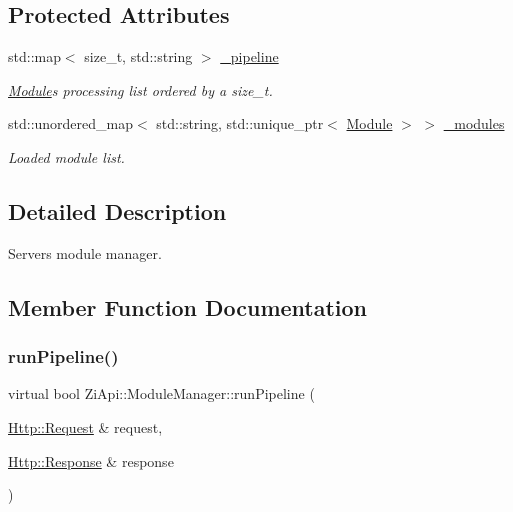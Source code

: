 \subsection*{Protected Attributes}
\begin{DoxyCompactItemize}
\item 
\mbox{\label{classZiApi_1_1ModuleManager_a9419290c9405733c97e8bdea9095b0f0}} 
std\+::map$<$ size\+\_\+t, std\+::string $>$ \mbox{\hyperlink{classZiApi_1_1ModuleManager_a9419290c9405733c97e8bdea9095b0f0}{\+\_\+pipeline}}
\begin{DoxyCompactList}\small\item\em \mbox{\hyperlink{classZiApi_1_1Module}{Module}}\textquotesingle{}s processing list ordered by a size\+\_\+t. \end{DoxyCompactList}\item 
\mbox{\label{classZiApi_1_1ModuleManager_a14887a7947963cbd29390a1951895af5}} 
std\+::unordered\+\_\+map$<$ std\+::string, std\+::unique\+\_\+ptr$<$ \mbox{\hyperlink{classZiApi_1_1Module}{Module}} $>$ $>$ \mbox{\hyperlink{classZiApi_1_1ModuleManager_a14887a7947963cbd29390a1951895af5}{\+\_\+modules}}
\begin{DoxyCompactList}\small\item\em Loaded module list. \end{DoxyCompactList}\end{DoxyCompactItemize}


\subsection{Detailed Description}
Server\textquotesingle{}s module manager. 

\subsection{Member Function Documentation}
\mbox{\label{classZiApi_1_1ModuleManager_a17ad1e83dc44dc40ba8a1dc07de29063}} 
\subsubsection{\texorpdfstring{runPipeline()}{runPipeline()}}
{\footnotesize\ttfamily virtual bool Zi\+Api\+::\+Module\+Manager\+::run\+Pipeline (\begin{DoxyParamCaption}\item[{\mbox{\hyperlink{classHttp_1_1Request}{Http\+::\+Request}} \&}]{request,  }\item[{\mbox{\hyperlink{classHttp_1_1Response}{Http\+::\+Response}} \&}]{response }\end{DoxyParamCaption})\hspace{0.3cm}{\ttfamily [pure virtual]}}



